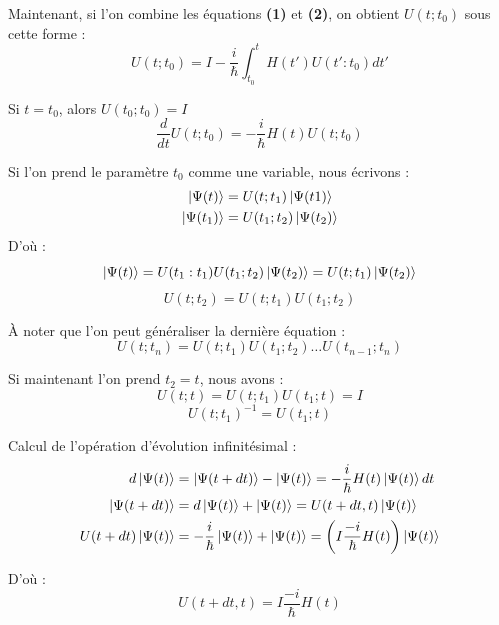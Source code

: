 \documentclass[12pt,a4paper,titlepage]{book}
\begin{document}
Maintenant, si l'on combine les équations \textbf{(1)} et \textbf{(2)}, on obtient $U(t ; t_0)$ sous cette forme :
\begin{equation*}
U(t;t_0) = I - \frac{i}{\hbar} \int_{t_0}^{t} H(t') U(t' : t_0) dt'
\end{equation*}

Si $t = t_0$, alors $U (t_0 ; t_0) = I$
\begin{equation*}
\frac{d}{dt} U(t ; t_0) = -\frac{i}{\hbar} H(t) U(t ; t_0)
\end{equation*}

Si l'on prend le paramètre $t_0$ comme une variable, nous écrivons :
\begin{align*}
\ket{\Psi (t)} &= U(t;t_1) \ket{\Psi(t1)}\\
\ket{\Psi (t_1)} &= U(t_1 ; t_2) \ket{\Psi (t_2)}
\end{align*}
D'où :
\begin{equation*}
\ket{\Psi (t)} = U(t_1 : t_1) U(t_1 ; t_2) \ket{\Psi (t_2)} = U(t ; t_1) \ket{\Psi (t_2)}
\end{equation*}
\begin{equation*}
U (t ; t_2) = U (t ; t_1) U (t_1 ; t_2)
\end{equation*}

À noter que l'on peut généraliser la dernière équation :
\begin{equation*}
U(t ; t_n) = U(t ; t_1) U(t_1 ; t_2) \ldots U(t_{n-1} ; t_n)
\end{equation*}

Si maintenant l'on prend $t_2 = t$, nous avons :
\begin{equation*}
U(t ; t) = U(t ; t_1) U(t_1 ; t) = I
\end{equation*}
\begin{equation*}
U(t ; t_1)^{-1} = U(t_1 ; t)
\end{equation*}

Calcul de l'opération d'évolution infinitésimal :
\begin{align*}
d \ket{\Psi (t)} &= \ket{\Psi (t+dt)} - \ket{\Psi (t)} = -\frac{i}{\hbar} H(t) \ket{\Psi (t)} dt\\
\ket{\Psi (t+dt)} &= d \ket{\Psi (t)} + \ket{\Psi (t)} = U(t+dt, t) \ket{\Psi (t)}\\
U(t+dt)\ket{\Psi (t)} &= -\frac{i}{\hbar}\ket{\Psi (t)} + \ket{\Psi (t)} = \left( I \frac{-i}{\hbar} H(t) \right) \ket{\Psi (t)}
\end{align*}

D'où :
\begin{equation*}
U (t+dt, t) = I \frac{-i}{\hbar} H(t)
\end{equation*}
\end{document}
